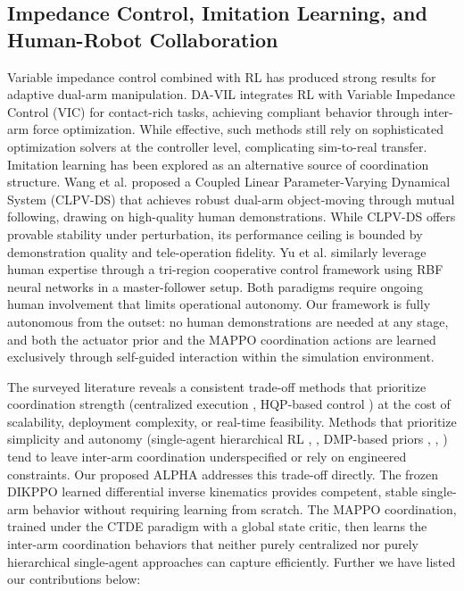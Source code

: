 \documentclass[a4paper,fleqn]{cas-dc}
\begin{document}
\subsection{Impedance Control, Imitation Learning, and Human-Robot Collaboration}
Variable impedance control combined with RL has produced strong results for adaptive dual-arm manipulation.
DA-VIL \cite{related-49} integrates RL with Variable Impedance Control (VIC) for contact-rich tasks, achieving compliant behavior through inter-arm force optimization. While effective, such methods still rely on sophisticated optimization solvers at the controller level, complicating sim-to-real transfer. Imitation learning has been explored as an alternative source of coordination structure. Wang et al. \cite{related-50} proposed a Coupled Linear Parameter-Varying Dynamical System (CLPV-DS) that achieves robust dual-arm object-moving through mutual following, drawing on high-quality human demonstrations. While CLPV-DS offers provable stability under perturbation, its performance ceiling is bounded by demonstration quality and tele-operation fidelity. Yu et al. \cite{related-51} similarly leverage human expertise through a tri-region cooperative control framework using RBF neural networks in a master-follower setup. Both paradigms require ongoing human involvement that limits operational autonomy. Our framework is fully autonomous from the outset: no human demonstrations are needed at any stage, and both the actuator prior and the MAPPO coordination actions are learned exclusively through self-guided interaction within the simulation environment.

The surveyed literature reveals a consistent trade-off methods that prioritize coordination strength (centralized execution \cite{related-43}, HQP-based control \cite{related-48}) at the cost of scalability, deployment complexity, or real-time feasibility. Methods that prioritize simplicity and autonomy (single-agent hierarchical RL \cite{related-38}, \cite{related-37}, DMP-based priors \cite{related-40}, \cite{related-41}, \cite{related-42}) tend to leave inter-arm coordination underspecified or rely on engineered constraints. Our proposed ALPHA addresses this trade-off directly. The frozen DIKPPO learned differential inverse kinematics provides competent, stable single-arm behavior without requiring learning from scratch. The MAPPO coordination, trained under the CTDE paradigm with a global state critic, then learns the inter-arm coordination behaviors that neither purely centralized nor purely hierarchical single-agent approaches can capture efficiently. Further we have listed our contributions below:
\end{document}
